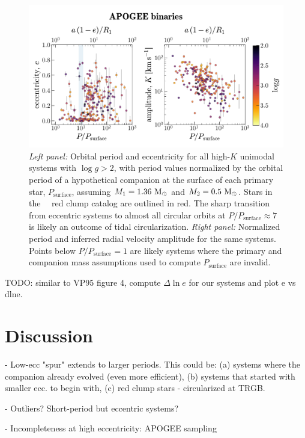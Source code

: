 \documentclass[modern, letterpaper]{aastex62}
\newcommand{\apogee}{\project{\acronym{APOGEE}}}
\newcommand{\DR}{\acronym{DR14}}
\begin{document}
\begin{figure}[h]
\begin{center}
\includegraphics[width=\textwidth]{P-e-K}
\end{center}
\caption{%
\textit{Left panel:} Orbital period and eccentricity for all high-$K$ unimodal
systems with $\log g > 2$, with period values normalized by the orbital period
of a hypothetical companion at the surface of each primary star,
$P_{\textrm{surface}}$, assuming $M_1 = 1.36~\mathrm{M}_\odot$ and $M_2 = 0.5~\mathrm{M}_\odot$.
Stars in the \apogee\ \DR\ red clump catalog are outlined in red.
The sharp transition from eccentric systems to almost all circular orbits at
$P/P_\textrm{surface} \approx 7$ is likely an outcome of tidal circularization.
\textit{Right panel:} Normalized period and inferred radial velocity amplitude
for the same systems.
Points below $P/P_\textrm{surface} = 1$ are likely systems where the primary and
companion mass assumptions used to compute $P_\textrm{surface}$ are invalid.
\label{fig:PeK}
}
\end{figure}

TODO: similar to VP95 figure 4, compute $\Delta \ln e$ for our systems and plot e vs dlne.

\section{Discussion} \label{sec:discussion}

- Low-ecc "spur" extends to larger periods. This could be: (a) systems where the companion already evolved (even more efficient), (b) systems that started with smaller ecc. to begin with, (c) red clump stars - circularized at TRGB.

- Outliers? Short-period but eccentric systems?

- Incompleteness at high eccentricity: APOGEE sampling
\end{document}
